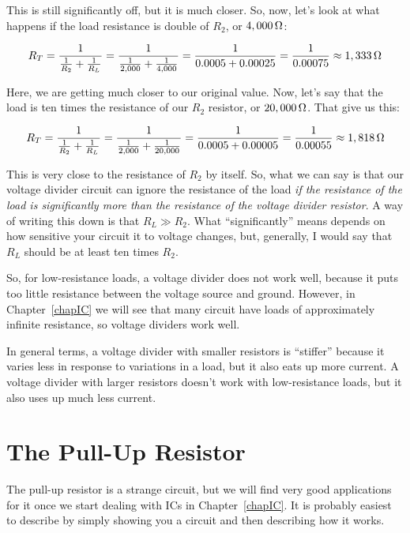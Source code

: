 This is still significantly off, but it is much closer.
So, now, let's look at what happens if the load resistance is double of $R_2$, or $4,000\,\si{\ohm}$:

$$ R_T = \frac{1}{\frac{1}{R_2} + \frac{1}{R_L}} = \frac{1}{\frac{1}{2,000} + \frac{1}{4,000}} = \frac{1}{0.0005 + 0.00025} = \frac{1}{0.00075} \approx 1,333\,\si{\ohm} $$

Here, we are getting much closer to our original value.  Now, let's say that the load is ten times the resistance of our $R_2$ resistor, or $20,000\,\si{\ohm}$.  That give us this:

$$ R_T = \frac{1}{\frac{1}{R_2} + \frac{1}{R_L}} = \frac{1}{\frac{1}{2,000} + \frac{1}{20,000}} = \frac{1}{0.0005 + 0.00005} = \frac{1}{0.00055} \approx 1,818\,\si{\ohm} $$

This is very close to the resistance of $R_2$ by itself.
So, what we can say is that our voltage divider circuit can ignore the resistance of the load \emph{if the resistance of the load is significantly more than the resistance of the voltage divider resistor}.
A way of writing this down is that $R_L \gg R_2$.
What ``significantly'' means depends on how sensitive your circuit it to voltage changes, but, generally, I would say that $R_L$ should be at least ten times $R_2$.

So, for low-resistance loads, a voltage divider does not work well, because it puts too little resistance between the voltage source and ground.
However, in Chapter~\ref{chapIC} we will see that many circuit have loads of approximately infinite resistance, so voltage dividers work well.

In general terms, a voltage divider with smaller resistors is ``stiffer'' because it varies less in response to variations in a load, but it also eats up more current.
A voltage divider with larger resistors doesn't work with low-resistance loads, but it also uses up much less current.

\section{The Pull-Up Resistor}
\label{secPullUpResistor}

The pull-up resistor is a strange circuit, but we will find very good applications for it once we start dealing with ICs in Chapter~\ref{chapIC}.
It is probably easiest to describe by simply showing you a circuit and then describing how it works.


